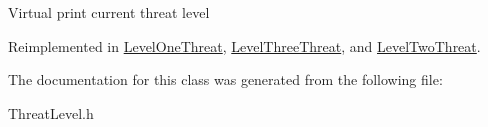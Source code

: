Virtual print current threat level 

Reimplemented in \hyperlink{classLevelOneThreat_a902492d8341a398b0209fb89e2aca68e}{Level\+One\+Threat}, \hyperlink{classLevelThreeThreat_a3bdd7e61f3938123ce9c705623e0d98a}{Level\+Three\+Threat}, and \hyperlink{classLevelTwoThreat_a9e21bc1a55bb25d86346c484f5fd0525}{Level\+Two\+Threat}.



The documentation for this class was generated from the following file\+:\begin{DoxyCompactItemize}
\item 
Threat\+Level.\+h\end{DoxyCompactItemize}
